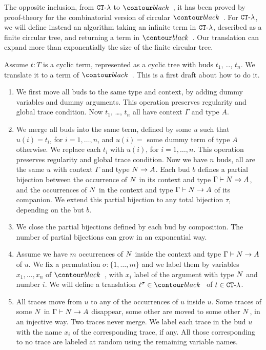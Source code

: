 \documentclass{article}
\begin{document}
The opposite inclusion, from ${ {\tt CT} \mbox{-} \lambda}$ to $\systemT$, it has been proved by proof-theory for the
combinatorial version of circular $\systemT$. For ${ {\tt CT} \mbox{-} \lambda}$, we will define instead an algorithm
taking an infinite term in  ${ {\tt CT} \mbox{-} \lambda}$, described as a finite circular tree, 
and returning a term in $\systemT$. Our translation can expand
more than exponentially the size of the finite circular tree.

Assume $t:T$ is a cyclic term, represented as a cyclic tree with buds $t_1$, \ldots, $t_n$.
We translate it to a term of $\systemT$. This is a first draft about how to do it.
 
\begin{enumerate}

\item
We first move all buds to the same type and context, by adding dummy variables and dummy arguments.
This operation preserves regularity and global trace condition.
Now $t_1$, \ldots, $t_n$ all have context $\Gamma$ and type $A$.

\item
We merge all buds into the same term, defined by some $u$ such that $u(i)=t_i$, for $i=1, \ldots, n$,
and $u(i)=$ some dummy term of type $A$ otherwise. We replace each $t_i$ with $u(i)$, 
for $i=1, \ldots, n$.
This operation preserves regularity and global trace condition.
Now we have $n$ buds, all are the same $u$ with context $\Gamma$ and type ${N} \rightarrow A$.
Each bud $b$ defines a partial bijection between the occurrence of ${N}$ in its context and type
$\Gamma \vdash {N} \rightarrow A$, and the occurrences of ${N}$ in the context and type
$\Gamma \vdash {N} \rightarrow A$ of its companion. 
We extend this partial bijection to any total bijection $\tau$, depending on the but $b$.

\item
We close the partial bijections defined by each bud by composition. The number of partial 
bijections can grow in an exponential  way.

\item
Assume we have $m$ occurrences of ${N}$ inside the context and type 
$\Gamma \vdash {N} \rightarrow A$ of $u$.
We fix a permutation $\sigma:\{1, \ldots, m\}$ 
and we label them by variables $x_1, \ldots, x_n$ of $\systemT$,
with $x_i$ label of the argument with type ${N}$ and number $i$.
We will define a translation $t^\sigma \in \systemT$ of  $t \in { {\tt CT} \mbox{-} \lambda}$.

\item
All traces move from $u$ to any of the occurrences of $u$ inside $u$. 
Some traces of some ${N}$
in $\Gamma \vdash {N} \rightarrow A$ disappear, some other are moved to some other ${N}$,
in an injective way. Two traces never merge.
We label each trace in the bud $u$ with the name $x_i$ of the corresponding trace, if any.
All those corresponding to no trace are labeled at random using the remaining variable names.


\end{enumerate}
\end{document}
